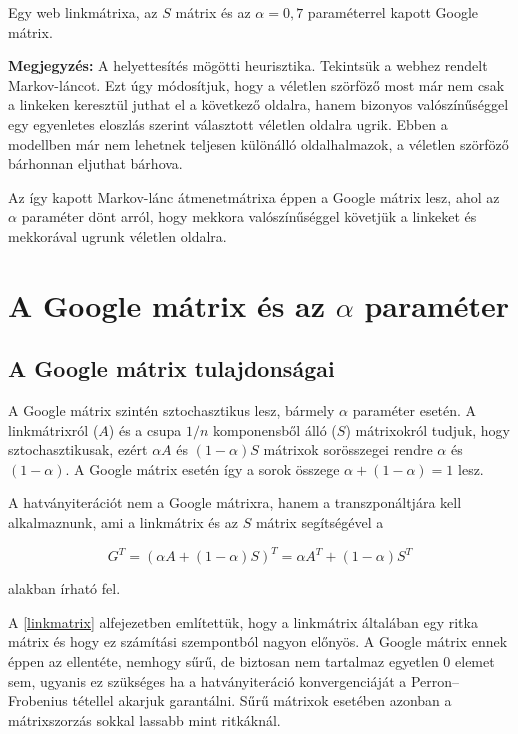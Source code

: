 \documentclass[12pt,a4paper]{article}
\begin{document}
\vspace{0.1 cm}
\centerline{Egy web linkmátrixa, az $S$ mátrix és az $\alpha = 0,7$ paraméterrel kapott Google mátrix.}
\vspace{0.3 cm}

\textbf{Megjegyzés:} A helyettesítés mögötti heurisztika. \newline
Tekintsük a webhez rendelt Markov-láncot. Ezt úgy módosítjuk, hogy a véletlen szörföző most már nem csak a linkeken keresztül juthat el a következő oldalra, hanem bizonyos valószínűséggel egy egyenletes eloszlás szerint választott véletlen oldalra ugrik. Ebben a modellben már nem lehetnek teljesen különálló oldalhalmazok, a véletlen szörföző bárhonnan eljuthat bárhova.

Az így kapott Markov-lánc átmenetmátrixa éppen a Google mátrix lesz, ahol az $\alpha$ paraméter dönt arról, hogy mekkora valószínűséggel követjük a linkeket és mekkorával ugrunk véletlen oldalra.

\section{A Google mátrix és az $\alpha$ paraméter}

\subsection{A Google mátrix tulajdonságai}

A Google mátrix szintén sztochasztikus lesz, bármely $\alpha$ paraméter esetén. A linkmátrixról ($A$) és a csupa $1/n$ komponensből álló ($S$) mátrixokról tudjuk, hogy sztochasztikusak, ezért $\alpha A$ és $(1-\alpha)S$ mátrixok sorösszegei rendre $\alpha$ és $(1-\alpha)$. A Google mátrix esetén így a sorok összege $\alpha+(1-\alpha) = 1$ lesz.

A hatványiterációt nem a Google mátrixra, hanem a transzponáltjára kell alkalmaznunk, ami a linkmátrix és az $S$ mátrix segítségével a 

\[ G^T = (\alpha A + (1-\alpha)S)^T = \alpha A^T + (1-\alpha) S^T \]

alakban írható fel.

\vspace{0.2cm}

A \ref{linkmatrix} alfejezetben említettük, hogy a linkmátrix általában egy ritka mátrix és hogy ez számítási szempontból nagyon előnyös. A Google mátrix ennek éppen az ellentéte, nemhogy sűrű, de biztosan nem tartalmaz egyetlen 0 elemet sem, ugyanis ez szükséges ha a hatványiteráció konvergenciáját a Perron–Frobenius tétellel akarjuk garantálni. Sűrű mátrixok esetében azonban a mátrixszorzás sokkal lassabb mint ritkáknál.
\end{document}
